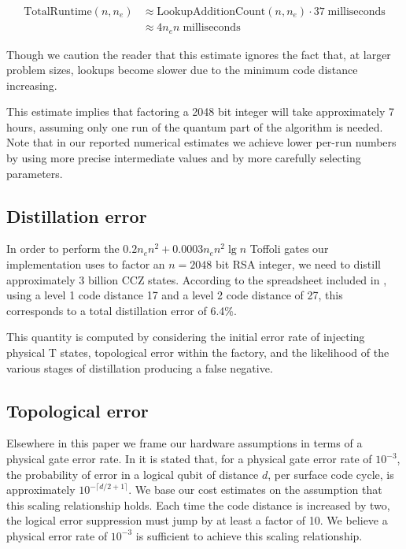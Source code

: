 \documentclass[a4paper, onecolumn, accepted=2021-03-29]{quantumarticle}
\newcommand{\lenexp}{{n_e}}
\begin{document}
\begin{equation}
\begin{aligned}
    \text{TotalRuntime}(n, \lenexp)
    &\approx \text{LookupAdditionCount}(n, \lenexp) \cdot 37 \;\text{milliseconds}
    \\&\approx 4 \lenexp n \;\text{milliseconds}
\end{aligned}
\end{equation}

Though we caution the reader that this estimate ignores the fact that, at larger problem sizes, lookups become slower due to the minimum code distance increasing.

This estimate implies that factoring a 2048 bit integer will take approximately 7 hours, assuming only one run of the quantum part of the algorithm is needed.
Note that in our reported numerical estimates we achieve lower per-run numbers by using more precise intermediate values and by more carefully selecting parameters.


\subsection{Distillation error}

In order to perform the $0.2 \lenexp n^2 + 0.0003 \lenexp n^2 \lg n$ Toffoli gates our implementation uses to factor an $n=2048$ bit RSA integer, we need to distill approximately 3 billion CCZ states.
According to the spreadsheet included in \cite{gidney2018magic}, using a level 1 code distance 17 and a level 2 code distance of 27, this corresponds to a total distillation error of 6.4\%.

This quantity is computed by considering the initial error rate of injecting physical T states, topological error within the factory, and the likelihood of the various stages of distillation producing a false negative.

\subsection{Topological error}

Elsewhere in this paper we frame our hardware assumptions in terms of a physical gate error rate.
In \cite{fowler2013surfaceblock} it is stated that, for a physical gate error rate of $10^{-3}$, the probability of error in a logical qubit of distance $d$, per surface code cycle, is approximately $10^{-\lceil d/2+1 \rceil}$.
We base our cost estimates on the assumption that this scaling relationship holds.
Each time the code distance is increased by two, the logical error suppression must jump by at least a factor of 10.
We believe a physical error rate of $10^{-3}$ is sufficient to achieve this scaling relationship.
\end{document}
